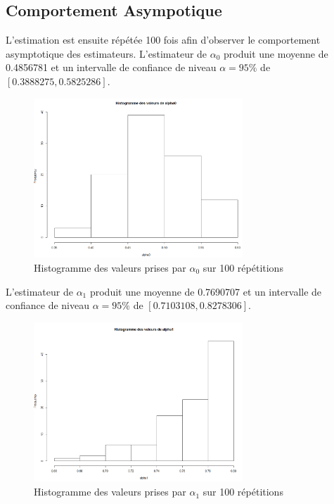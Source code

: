 \documentclass[11pt]{article}
\begin{document}
\subsection{Comportement Asympotique}

	L'estimation est ensuite répétée 100 fois afin d'observer le comportement asymptotique des estimateurs.
	L'estimateur de $\alpha_{0}$ produit une moyenne de 0.4856781 et un intervalle de confiance de niveau $\alpha = 95\%$ de $[0.3888275,0.5825286]$.
	
	\begin{figure}[H]
		\centering
		\includegraphics[height=6cm]{alpha02.png}
		\caption[Paramètre $\alpha_{0}$]{Histogramme des valeurs prises par $\alpha_{0}$ sur 100 répétitions} 
		\label{alpha02}
	\end{figure}
		
	L'estimateur de $\alpha_{1}$ produit une moyenne de  0.7690707 et un intervalle de confiance de niveau $\alpha = 95\%$ de $[0.7103108,0.8278306]$.

	\begin{figure}[H]
		\centering
		\includegraphics[height=6cm]{alpha12.png}
		\caption[Paramètre $\alpha_{1}$]{Histogramme des valeurs prises par $\alpha_{1}$ sur 100 répétitions} 
		\label{alpha12}
	\end{figure}
		
\end{document}
